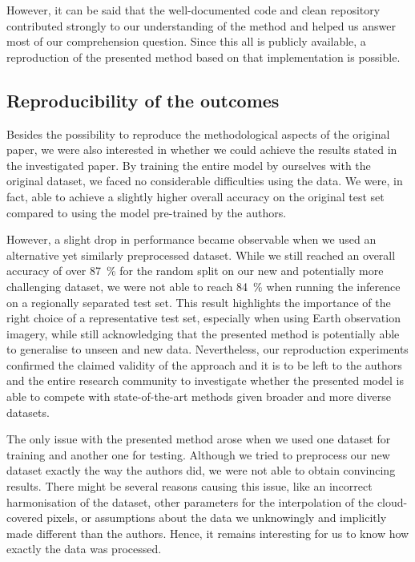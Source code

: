 However, it can be said that the well-documented code and clean \GitHub repository contributed strongly to our understanding of the method and helped us answer most of our comprehension question.
Since this all is publicly available, a reproduction of the presented method based on that implementation is possible.


\subsection{Reproducibility of the outcomes}

Besides the possibility to reproduce the methodological aspects of the original paper, we were also interested in whether we could achieve the results stated in the investigated paper.
By training the entire model by ourselves with the original dataset, we faced no considerable difficulties using the data.
We were, in fact, able to achieve a slightly higher overall accuracy on the original test set compared to using the model pre-trained by the authors.

However, a slight drop in performance became observable when we used an alternative yet similarly preprocessed dataset.
While we still reached an overall accuracy of over \SI{87}{\percent} for the random split on our new and potentially more challenging dataset, we were not able to reach \SI{84}{\percent} when running the inference on a regionally separated test set.
This result highlights the importance of the right choice of a representative test set, especially when using Earth observation imagery, while still acknowledging that the presented method is potentially able to generalise to unseen and new data.
Nevertheless, our reproduction experiments confirmed the claimed validity of the approach and it is to be left to the authors and the entire research community to investigate whether the presented model is able to compete with state-of-the-art methods given broader and more diverse datasets.

The only issue with the presented method arose when we used one dataset for training and another one for testing.
Although we tried to preprocess our new dataset exactly the way the authors did, we were not able to obtain convincing results.
There might be several reasons causing this issue, like an incorrect harmonisation of the dataset, other parameters for the interpolation of the cloud-covered pixels, or assumptions about the data we unknowingly and implicitly made different than the authors.
Hence, it remains interesting for us to know how exactly the data was processed.

